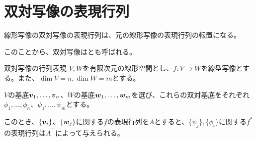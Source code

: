 \documentclass[../../../topic_linear-algebra]{subfiles}
\begin{document}
\sectionline
\section{双対写像の表現行列}

線形写像の双対写像の表現行列は、元の線形写像の表現行列の転置になる。

このことから、双対写像はとも呼ばれる。

\begin{theorem}{双対写像の行列表現}
  $V,W$を有限次元の線形空間とし、$f\colon V \to W$を線型写像とする。また、$\dim V = n, \dim W = m$とする。
  
  $V$の基底$\vb*{v}_1,\ldots,\vb*{v}_n$、$W$の基底$\vb*{w}_1, \ldots, \vb*{w}_m$を選び、これらの双対基底をそれぞれ$\phi_1, \ldots, \phi_n$、$\psi_1, \ldots, \psi_m$とする。

  このとき、$\{\vb*{v}_i \}$、$\{ \vb*{w}_j\}$に関する$f$の表現行列を$A$とすると、$\{ \psi_j \}, \{ \phi_i \}$に関する$f^*$の表現行列は$A^\top$によって与えられる。
\end{theorem}
\end{document}
